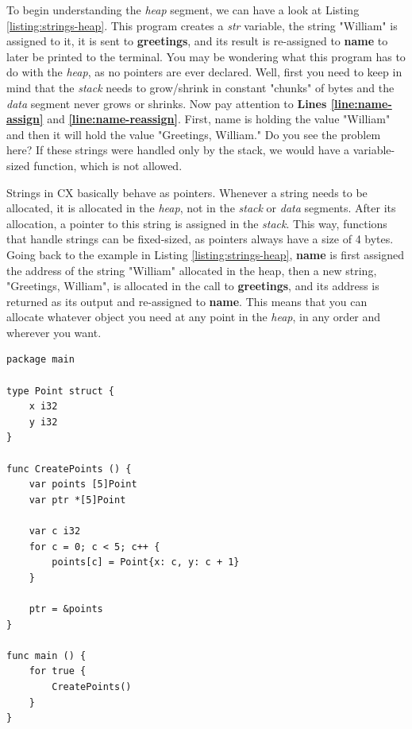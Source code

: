 \documentclass[11pt,fleqn,openany]{book} %
\begin{document}
To begin understanding the \emph{heap} segment, we can have a look at Listing \ref{listing:strings-heap}. This program creates a \emph{str} variable, the string "William" is assigned to it, it is sent to \textbf{greetings}, and its result is re-assigned to \textbf{name} to later be printed to the terminal. You may be wondering what this program has to do with the \emph{heap}, as no pointers are ever declared. Well, first you need to keep in mind that the \emph{stack} needs to grow/shrink in constant "chunks" of bytes and the \emph{data} segment never grows or shrinks. Now pay attention to \textbf{Lines \ref{line:name-assign}} and \textbf{\ref{line:name-reassign}}. First, name is holding the value "William" and then it will hold the value "Greetings, William." Do you see the problem here? If these strings were handled only by the stack, we would have a variable-sized function, which is not allowed.

Strings in CX basically behave as pointers. Whenever a string needs to be allocated, it is allocated in the \emph{heap}, not in the \emph{stack} or \emph{data} segments. After its allocation, a pointer to this string is assigned in the \emph{stack}. This way, functions that handle strings can be fixed-sized, as pointers always have a size of 4 bytes. Going back to the example in Listing \ref{listing:strings-heap}, \textbf{name} is first assigned the address of the string "William" allocated in the heap, then a new string, "Greetings, William", is allocated in the call to \textbf{greetings}, and its address is returned as its output and re-assigned to \textbf{name}. This means that you can allocate whatever object you need at any point in the \emph{heap}, in any order and wherever you want.

\begin{lstlisting}[caption={Pointer to a Structu},captionpos=b,label={listing:heap-overflow}]
package main

type Point struct {
	x i32
	y i32
}

func CreatePoints () {
	var points [5]Point
	var ptr *[5]Point
	
	var c i32
	for c = 0; c < 5; c++ {
		points[c] = Point{x: c, y: c + 1}
	}

	ptr = &points
}

func main () {
	for true {
		CreatePoints()
	}
}
\end{lstlisting}
\end{document}
